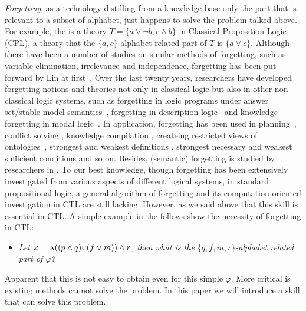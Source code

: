 \documentclass{article}
\begin{document}
 \emph{Forgetting}, as a technology distilling from a knowledge base only the part that is relevant to a subset of alphabet, just happens to solve the problem talked above.
 For example, the is a theory $T=\{a \vee \neg b, c \wedge b\}$ in Classical Proposition Logic (CPL), a theory that the $\{a, c\}$-alphabet related part of $T$ is $\{a\vee c\}$.
  Although there have been a number of studies on similar methods of forgetting, such as variable elimination, irrelevance and independence\cite{bobrow1997special}, forgetting has been put forward by Lin at first~\cite{lin1994forget}. Over the last twenty years, researchers have developed forgetting notions and theories not only in classical logic but also in other non-classical logic systems, such as forgetting in logic programs under answer set/stable model semantics~\cite{DBLP:Zhang:AIJ2006,Eiter2008Semantic,Wong:PhD:Thesis,Yisong:KR:2012,Yisong:IJCAI:2013}, forgetting in description logic~\cite{Wang:AMAI:2010,Lutz:IJCAI:2011,zhao2017role} and knowledge forgetting in modal logic~\cite{Zhang2009Knowledge,Kaile:JAIR:2009,Yongmei:IJCAI:2011,fang2019forgetting}. In application, forgetting has been used in planning~\cite{lin2003compiling},  conflict solving \cite{Lang2010Reasoning,Zhang2005Solving}, knowledge compilation \cite{Zhang2009Knowledge,Bienvenu2010Knowledge}, createing restricted views of ontologies~\cite{ZhaoSchmidt18a}, strongest and weakest definitions \cite{Lang2008On}, strongest necessary and weakest
sufficient conditions \cite{lin2001strongest} and so on. Besides, (semantic) forgetting is studied by researchers in \cite{Marquis2003Propositional,Eiter2008Semantic}.  To our best knowledge, though forgetting has been extensively investigated from various aspects of different logical systems, in standard propositional logic, a general algorithm of forgetting and its computation-oriented investigation in CTL are still lacking.
However, as we said above that this skill is essential in CTL. A simple example in the follows show the necessity of forgetting in CTL:
\begin{itemize}
  \item \emph{Let $\varphi = \textsc{a}((p\wedge q) \textsc{u} (f\vee m))\wedge r$, then what is the $\{q,f,m,r\}$-alphabet related part of $\varphi$?}
\end{itemize}
Apparent that this is not easy to obtain even for this simple $\varphi$. More critical is existing methods cannot solve the problem.
In this paper we will introduce a skill that can solve this problem.
\end{document}
